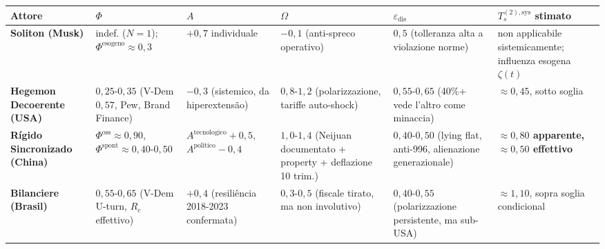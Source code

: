 {\def\LTcaptype{none} %
{\small\begin{longtable}[]{@{}
  >{\raggedright\arraybackslash}p{}
  >{\raggedright\arraybackslash}p{}
  >{\raggedright\arraybackslash}p{}
  >{\raggedright\arraybackslash}p{}
  >{\raggedright\arraybackslash}p{}
  >{\raggedright\arraybackslash}p{}@{}}
\toprule\noalign{}
\begin{minipage}[b]{\linewidth}\raggedright
Attore
\end{minipage} & \begin{minipage}[b]{\linewidth}\raggedright
\(\Phi\)
\end{minipage} & \begin{minipage}[b]{\linewidth}\raggedright
\(A\)
\end{minipage} & \begin{minipage}[b]{\linewidth}\raggedright
\(\Omega\)
\end{minipage} & \begin{minipage}[b]{\linewidth}\raggedright
\(\varepsilon_{\text{dis}}\)
\end{minipage} & \begin{minipage}[b]{\linewidth}\raggedright
\(T_s^{(2),\text{sys}}\) stimato
\end{minipage} \\
\midrule\noalign{}
\endhead
\bottomrule\noalign{}
\endlastfoot
\textbf{Soliton (Musk)} & indef. (\(N=1\));
\(\Phi^{\text{esogeno}} \approx 0{,}3\) & \(+0{,}7\) individuale &
\(-0{,}1\) (anti-spreco operativo) & \(0{,}5\) (tolleranza alta a
violazione norme) & non applicabile sistemicamente; influenza esogena
\(\zeta(t)\) \\
\textbf{Hegemon Decoerente (USA)} & \(0{,}25\)-\(0{,}35\) (V-Dem
\(0{,}57\), Pew, Brand Finance) & \(-0{,}3\) (sistemico, da
hiperextensão) & \(0{,}8\)-\(1{,}2\) (polarizzazione, tariffe
auto-shock) & \(0{,}55\)-\(0{,}65\) (40\%+ vede l'altro come minaccia) &
\textbf{\(\approx 0{,}45\)}, sotto soglia \\
\textbf{Rígido Sincronizado (China)} &
\(\Phi^{\text{oss}} \approx 0{,}90\),
\(\Phi^{\text{spont}} \approx 0{,}40\)-\(0{,}50\) &
\(A^{\text{tecnologico}} +0{,}5\), \(A^{\text{politico}} -0{,}4\) &
\(1{,}0\)-\(1{,}4\) (Neijuan documentato + property + deflazione 10
trim.) & \(0{,}40\)-\(0{,}50\) (lying flat, anti-996, alienazione
generazionale) & \textbf{\(\approx 0{,}80\) apparente,
\(\approx 0{,}50\) effettivo} \\
\textbf{Bilanciere (Brasil)} & \(0{,}55\)-\(0{,}65\) (V-Dem U-turn,
\(R_c\) effettivo) & \(+0{,}4\) (resiliência 2018-2023 confermata) &
\(0{,}3\)-\(0{,}5\) (fiscale tirato, ma non involutivo) &
\(0{,}40\)-\(0{,}55\) (polarizzazione persistente, ma sub-USA) &
\textbf{\(\approx 1{,}10\)}, sopra soglia condicional \\
\end{longtable}}
}

